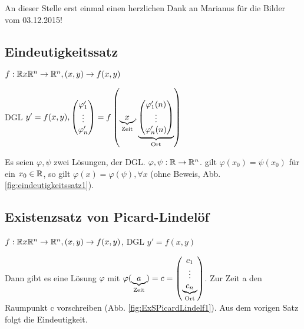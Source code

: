 \renewcommand{\ldate}{2015-12-03}
An dieser Stelle erst einmal einen herzlichen Dank an Marianus für die Bilder vom 03.12.2015! 
 
\subsection{Eindeutigkeitssatz}
\begin{satz}[Eindeutigkeitssatz]
$f: \mathbb{R} x \mathbb{R}^n \rightarrow \mathbb{R}^n, (x,y) \rightarrow f(x,y) $

DGL $y' = f(x,y),  \begin{pmatrix} \varphi'_1\\\vdots\\\varphi'_n \end{pmatrix}  = f \left( \underbrace{x}_{\textrm{Zeit}}, \underbrace{ \begin{pmatrix} \varphi'_1(n)\\\vdots\\\varphi'_n(n) \end{pmatrix} }_{\textrm{Ort}} \right)  $

Es seien $\varphi, \psi$ zwei Lösungen, der DGL. $\varphi, \psi : \mathbb{R} \rightarrow \mathbb{R}^n$. gilt $\varphi(x_0) = \psi(x_0)$ für ein $x_0 \in \mathbb{R}$, so gilt $\varphi(x)=\varphi(\psi), \forall x$ (ohne Beweis, Abb. \ref{fig:eindeutigkeitssatz1}).
\end{satz}

\subsection{Existenzsatz von Picard-Lindelöf}
\begin{satz}
$f: \mathbb{R} x \mathbb{R}^n \rightarrow \mathbb{R}^n, (x,y) \rightarrow f(x,y) $, DGL $y' = f(x,y)$ 

Dann gibt es eine Lösung $\varphi$ mit $\varphi(\underbrace{a}_{\textrm{Zeit}}) = c =  \begin{pmatrix} c_1\\\vdots\\\underbrace{c_n}_{\textrm{Ort}} \end{pmatrix} $. Zur Zeit a den Raumpunkt c vorschreiben (Abb. \ref{fig:ExSPicardLindelf1}). Aus dem vorigen Satz folgt die Eindeutigkeit. 
\end{satz}

